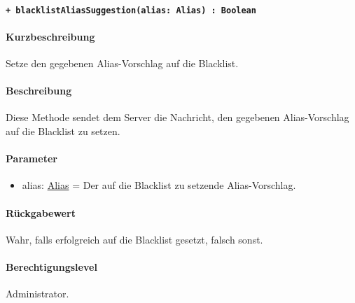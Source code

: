 \paragraph{\texttt{+ blacklistAliasSuggestion(alias: Alias) : Boolean}}\label{AP_Backend_blacklistAliasSuggestion}%
\paragraph*{Kurzbeschreibung}
Setze den gegebenen Alias-Vorschlag auf die Blacklist.
\paragraph*{Beschreibung}
Diese Methode sendet dem Server die Nachricht, den gegebenen Alias-Vorschlag auf die Blacklist zu setzen.
\paragraph*{Parameter}
\begin{itemize}
    \item alias: \hyperref[AP_Alias]{Alias} = Der auf die Blacklist zu setzende Alias-Vorschlag.
\end{itemize}
\paragraph*{Rückgabewert}
Wahr, falls erfolgreich auf die Blacklist gesetzt, falsch sonst.
\paragraph*{Berechtigungslevel}
Administrator.